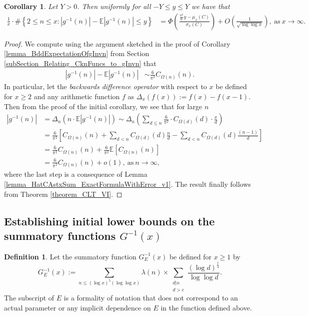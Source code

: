 \documentclass[11pt,reqno,a4letter]{article}
\numberwithin{figure}{section}
\numberwithin{table}{section}
\theoremstyle{plain}
\newtheorem{cor}[theorem]{Corollary}
\numberwithin{theorem}{section}
\theoremstyle{definition}
\newtheorem{definition}[theorem]{Definition}
\begin{document}
\begin{cor} 
\label{cor_CLT_VII} 
Let $Y > 0$. 
Then uniformly for all $-Y \leq y \leq Y$ 
we have that 
\begin{align*} 
\frac{1}{x} \cdot \#\left\{2 \leq n \leq x:|g^{-1}(n)| - 
     \mathbb{E}|g^{-1}(n)| \leq y\right\} & = 
     \Phi\left(\frac{\frac{\pi^2}{6} y - \mu_x(C)}{\sigma_x(C)}\right) + 
     O\left(\frac{1}{\sqrt{\log\log x}}\right), 
     \mathrm{\ as\ } x \rightarrow \infty. 
\end{align*} 
\end{cor} 
\begin{proof} 
We compute using the argument sketched in the proof of 
Corollary \ref{lemma_BddExpectationOfgInvn} from 
Section \ref{subSection_Relating_CknFuncs_to_gInvn} that 
\begin{align*} 
|g^{-1}(n)| - \mathbb{E}|g^{-1}(n)| & \sim \frac{6}{\pi^2} C_{\Omega(n)}(n). 
\end{align*} 
In particular, let the \emph{backwards difference operator} with respect to $x$ 
be defined for $x \geq 2$ and any arithmetic function $f$ as 
$\Delta_x(f(x)) := f(x) - f(x-1)$. Then from the proof of the initial corollary, 
we see that for large $n$ 
\begin{align*} 
|g^{-1}(n)| & = \Delta_n(n \cdot \mathbb{E}|g^{-1}(n)|) 
     \sim \Delta_n\left(\sum_{d \leq n} \frac{6}{\pi^2} \cdot C_{\Omega(d)}(d) \cdot \frac{x}{d}\right) \\ 
     & = \frac{6}{\pi^2}\left[C_{\Omega(n)}(n) + \sum_{d < n} C_{\Omega(d)}(d) \frac{n}{d} - 
     \sum_{d<n} C_{\Omega(d)}(d) \frac{(n-1)}{d}\right] \\ 
     & = \frac{6}{\pi^2} C_{\Omega(n)}(n) + \frac{6}{\pi^2} \mathbb{E}[C_{\Omega(n)}(n)] \\ 
     & = \frac{6}{\pi^2} C_{\Omega(n)}(n) + o(1), 
     \mathrm{\ as\ } n \rightarrow \infty, 
\end{align*} 
where the last step is a consequence of 
Lemma \ref{lemma_HatCAstxSum_ExactFormulaWithError_v1}. 
The result finally follows from Theorem \ref{theorem_CLT_VI}. 
\end{proof} 

\subsection{Establishing initial lower bounds on the summatory functions $G^{-1}(x)$} 
\label{Section_ProofOfValidityOfAverageOrderLowerBounds} 

\begin{definition} 
Let the summatory function $G_E^{-1}(x)$ be defined for $x \geq 1$ by 
\begin{equation} 
\label{eqn_GEInvxSummatoryFuncDef_v1} 
G_E^{-1}(x) := \sum_{n \leq (\log x)^{5} (\log\log x)} \lambda(n) \times 
     \sum_{\substack{d|n \\ d > e}} \frac{(\log d)^{\frac{1}{4}}}{\log\log d}. 
\end{equation} 
The subscript of $E$ is a formality of 
notation that does not correspond to an actual parameter or any 
implicit dependence on $E$ in the function defined above. 
\end{definition} 
\end{document}
